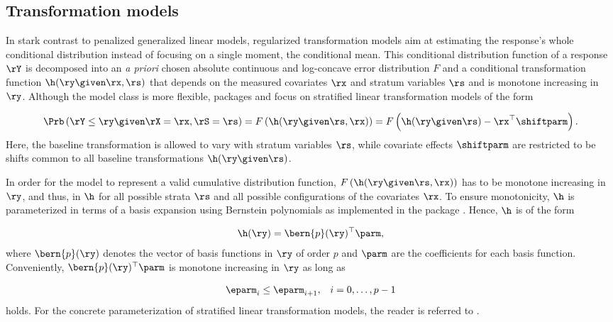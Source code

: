 \subsection{Transformation models} \label{subsec:tram}

In stark contrast to penalized generalized linear models, regularized
transformation models aim at estimating the response's whole conditional distribution
instead of focusing on a single moment, \eg the conditional mean.
This conditional distribution function of a response $\rY$ is decomposed into an
\textit{a priori} chosen absolute continuous and log-concave error distribution
$F$ and a conditional transformation function $\h(\ry \given \rx, \rs)$ that depends
on the measured covariates $\rx$ and stratum variables $\rs$ and is monotone
increasing in $\ry$.
Although the model class is more flexible, 
packages  and  focus on stratified linear transformation models of the form

\begin{align} \label{fm:trafo}
	\Prb\left(\rY \le \ry \given \rX = \rx, \rS = \rs \right) =
	F\left(\h(\ry \given \rs, \rx)\right) = F\left(\h(\ry \given \rs) -
	\rx^\top\shiftparm\right).
\end{align}
Here, the baseline transformation is allowed to vary with stratum variables $\rs$,
while covariate effects $\shiftparm$ are restricted to be shifts common to all
baseline transformations $\h(\ry \given \rs)$.

In order for the model to represent a valid cumulative distribution function,
$F\left(\h(\ry \given \rs, \rx)\right)$ has to be monotone increasing in $\ry$, and thus,
in $\h$ for all possible strata $\rs$ and all possible configurations of the
covariates $\rx$. To ensure monotonicity, $\h$ is parameterized in terms of a basis
expansion using Bernstein polynomials as implemented in the 
package \citep{mltjss}. Hence, $\h$ is of the form

\begin{align*}
	\h(\ry) = \bern{p}(\ry)^\top \parm,
\end{align*}
where $\bern{p}(\ry)$ denotes the vector of basis functions in $\ry$ of order $p$
and $\parm$ are the coefficients for each basis function. Conveniently,
$\bern{p}(\ry)^\top \parm$ is monotone increasing in $\ry$ as long as

\begin{align} \label{eq:const}
\begin{array}{ll}
\eparm_i \leq \eparm_{i+1}, & i = 0, \dots, p - 1
\end{array}
\end{align}
holds. For the concrete parameterization of stratified linear transformation
models, the reader is referred to \citet{pkg:tram}.


